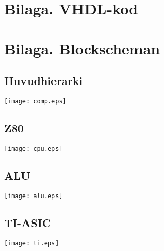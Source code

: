 \documentclass[main.tex]{subfiles}
\begin{document}
\appendix
\section{Bilaga. VHDL-kod}


\newpage
\recalctypearea
\vspace*{-10mm}
\section{Bilaga. Blockscheman}
\subsection{Huvudhierarki}
\label{diag:comp}
\begin{minipage}{\textwidth}
    \texttt{[image: comp.eps]}
\end{minipage}
\vspace*{-10mm}
\subsection{Z80}
\label{diag:z80}
\begin{minipage}{\textwidth}
    \vspace{-2mm}
    \hspace{-15mm}
    \texttt{[image: cpu.eps]}
\end{minipage}
\vspace*{-10mm}
\subsection{ALU}
\label{diag:alu}
\begin{minipage}{\textwidth}
    \texttt{[image: alu.eps]}
\end{minipage}
\vspace*{-10mm}
\subsection{TI-ASIC}
\label{diag:ti}
\begin{minipage}{\textwidth}
    \texttt{[image: ti.eps]}
\end{minipage}
\newpage
\recalctypearea
\end{document}
